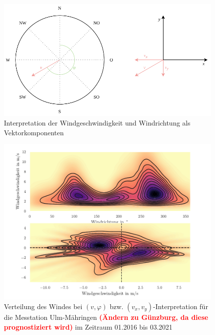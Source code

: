 \documentclass[
12pt, %
toc=listofnumbered, %
toc=chapterentrydotfill, %
numbers=noenddot, %
captions=tableheading, %
bibliography=numbered
]{scrreprt}
\newcommand{\highlight}[1]{\textbf{\textcolor{red}{#1}}}
\begin{document}
\begin{figure}[tph]
	\begin{center}
		\includegraphics[scale = 1]{./images/pol2cart.pdf}
		\caption{Interpretation der Windgeschwindigkeit und Windrichtung als Vektorkomponenten}
		\label{fig:pol2cart}
	\end{center}
\end{figure}

\begin{figure}[tph]
	\begin{center}
		\includegraphics[scale = 1]{./images/pol2cart_visualize.pdf}
		\caption{Verteilung des Windes bei $(v,\varphi)$ bzw. $(v_x,v_y)$-Interpretation für die Messtation Ulm-Mähringen \highlight{(Ändern zu Günzburg, da diese prognostiziert wird)} im Zeitraum 01.2016 bis 03.2021}
		\label{fig:pol2cart2}
	\end{center}
\end{figure}
\end{document}
